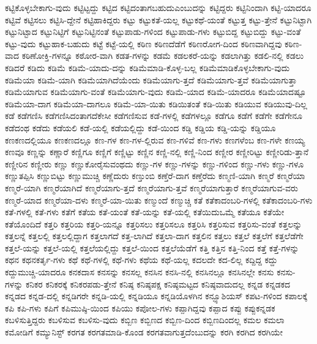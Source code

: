 {ಕಟ್ಟಿಕೊಳ್ಳಬೇಕಾಗು-ವುದು
ಕಟ್ಟಿಟ್ಟದ್ದು
ಕಟ್ಟಿದ
ಕಟ್ಟಿದಂತಾಗಬಹುದುಎಂಬುದನ್ನು
ಕಟ್ಟಿದ್ದರು
ಕಟ್ಟಿನಿಂದಾಗಿ
ಕಟ್ಟಿ-ಯಾದರೂ
ಕಟ್ಟಿವೆ
ಕಟ್ಟಿಸಲು
ಕಟ್ಟಿಸಿ-ದ್ದೇನೆ
ಕಟ್ಟಿಹಾಕಿದ್ದರು
ಕಟ್ಟು
ಕಟ್ಟುಕತೆ-ಯಲ್ಲ
ಕಟ್ಟುಕಥೆ-ಯಂತೆ
ಕಟ್ಟುತ್ತ
ಕಟ್ಟು-ತ್ತೇನೆ
ಕಟ್ಟುನಿಟ್ಟಾಗಿ
ಕಟ್ಟುನಿಟ್ಟಾದ
ಕಟ್ಟುನಿಟ್ಟಿಗೆ
ಕಟ್ಟುನಿಟ್ಟಿನಂತೆ
ಕಟ್ಟುಪಾಡು-ಗಳಿಂದ
ಕಟ್ಟುಪಾಡು-ಗಳು
ಕಟ್ಟುಬಿದ್ದ
ಕಟ್ಟುಬಿದ್ದು
ಕಟ್ಟು-ವಂತೆ
ಕಟ್ಟು-ವುದು
ಕಟ್ಟುಹಾಕ-ಬಹುದು
ಕಟ್ಟೆ
ಕಟ್ಟೆ-ಯಲ್ಲಿ
ಕಠಿಣ
ಕಠಿಣದೆಡೆಗೆ
ಕಠಿಣರೋಗ-ದಿಂದ
ಕಠಿಣವಾಗಿದ್ದವು
ಕಠಿಣ-ವಾದ
ಕಠಿಣೋಕ್ತಿ-ಗಳನ್ನೂ
ಕಠೋರ-ವಾಗಿ
ಕಡತ-ಗಳನ್ನು
ಕಡಮೆ
ಕಡಲಕರೆ-ಯನ್ನು
ಕಡಲಾಗಿತ್ತು
ಕಡಲಿ-ನಲ್ಲಿ
ಕಡಲು
ಕಡಿದರೆ
ಕಡಿದು
ಕಡಿಮೆ
ಕಡಿಮೆ-ಯಾದು-ದನ್ನು
ಕಡಿಮೆಮಾಡಿ-ಕೊಳ್ಳ-ಬಲ್ಲ
ಕಡಿಮೆಮಾಡಿಕೊಳ್ಳಬೇಕಾಗು-ವುದು
ಕಡಿಮೆಯಾ
ಕಡಿಮೆ-ಯಾಗಿ
ಕಡಿಮೆಯಾಗಿದೆಯೆಂದು
ಕಡಿಮೆಯಾಗು-ತ್ತದೆ
ಕಡಿಮೆಯಾಗು-ತ್ತವೆ
ಕಡಿಮೆಯಾಗುತ್ತಾ
ಕಡಿಮೆಯಾಗುವ
ಕಡಿಮೆಯಾಗು-ವಂತೆ
ಕಡಿಮೆಯಾಗು-ವುದು
ಕಡಿಮೆ-ಯಾದ
ಕಡಿಮೆ-ಯಾದರೂ
ಕಡಿಮೆಯಾದಷ್ಟೂ
ಕಡಿಮೆಯಾ-ದಾಗ
ಕಡಿಮೆಯಾ-ದಾಗಲೂ
ಕಡಿಮೆ-ಯಾ-ಯಿತು
ಕಡಿಯಿತಂತೆ
ಕಡಿ-ಯಿತು
ಕಡಿಯುವ
ಕಡಿಯುವು-ದಿಲ್ಲ
ಕಡೆ
ಕಡೆಗಣಿಸಿ
ಕಡೆಗಣಿಸಿದಂತಾಗದೆಕೇಸೀ
ಕಡೆಗಣಿಸುವ
ಕಡೆ-ಗಳಲ್ಲಿ
ಕಡೆಗಳಲ್ಲೂ
ಕಡೆಗೂ
ಕಡೆಗೆ
ಕಡೆಗೇ
ಕಡೆಗೇನೂ
ಕಡೆದಂಥ
ಕಡೆದು
ಕಡೆಯಲಿ
ಕಡೆ-ಯಲ್ಲಿ
ಕಡೆಯಲ್ಲಿದ್ದು
ಕಡೆ-ಯಿಂದ
ಕಡ್ಡಿ
ಕಡ್ಡಿಯ
ಕಡ್ಡಿ-ಯನ್ನು
ಕಡ್ಡಿಯೂ
ಕಣಕಣದಲ್ಲಿಯೂ
ಕಣಕಣದಲ್ಲೂ
ಕಣ-ಗಳ
ಕಣ-ಗಳ-ಲ್ಲಿರುವ
ಕಣ-ಗಳಿವೆ
ಕಣ-ಗಳು
ಕಣಗಳೆಂಬ
ಕಣ-ಗಳೇ
ಕಣಯ್ಯ
ಕಣವೂ
ಕಣ್ಣನ್ನು
ಕಣ್ಣಾರೆ
ಕಣ್ಣಿಗೂ
ಕಣ್ಣಿಗೆ
ಕಣ್ಣಿಟ್ಟು
ಕಣ್ಣಿನ
ಕಣ್ಣಿ-ನಲ್ಲಿ
ಕಣ್ಣಿ-ನಿಂದ
ಕಣ್ಣೀರ
ಕಣ್ಣೀರಿಟ್ಟು
ಕಣ್ಣೀರಿಡು-ತ್ತಾನೆ
ಕಣ್ಣೀರಿನ
ಕಣ್ಣೀರು
ಕಣ್ಣು
ಕಣ್ಣುಕೋರೈಸುವಂಥದು
ಕಣ್ಣು-ಗಳ
ಕಣ್ಣು-ಗಳನ್ನು
ಕಣ್ಣು-ಗಳಿಂದ
ಕಣ್ಣು-ಗಳು
ಕಣ್ಣು-ಗಳೂ
ಕಣ್ಣುತಪ್ಪಿಸಿ
ಕಣ್ಣುಬಿಟ್ಟು
ಕಣ್ಣುಮುಚ್ಚಿ
ಕಣ್ಣೆದುರು
ಕಣ್ತುಂಬಿ
ಕಣ್ತೆರೆ-ದಾಗ
ಕಣ್ತೆರೆದು
ಕಣ್ಮಣಿ-ಯಾಗಿ
ಕಣ್ಮರೆ
ಕಣ್ಮರೆಯಾ
ಕಣ್ಮರೆ-ಯಾಗಿ
ಕಣ್ಮರೆಯಾಗಿದೆ
ಕಣ್ಮರೆಯಾಗು-ತ್ತದೆ
ಕಣ್ಮರೆಯಾಗು-ತ್ತವೆ
ಕಣ್ಮರೆಯಾಗುತ್ತಾರೆ
ಕಣ್ಮರೆಯಾಗುವ-ವರು
ಕಣ್ಮರೆ-ಯಾದ
ಕಣ್ಮರೆಯಾ-ದಳು
ಕಣ್ಮರೆ-ಯಾ-ಯಿತು
ಕಣ್ಮುಂದೆ
ಕಣ್ಮುಚ್ಚಿ
ಕತೆ
ಕತೆಕಾದಂಬರಿ-ಗಳಲ್ಲಿ
ಕತೆಕಾದಂಬರಿ-ಗಳು
ಕತೆ-ಗಳಲ್ಲಿ
ಕತೆ-ಗಳು
ಕತೆಗೆ
ಕತೆಯ
ಕತೆ-ಯಂತೆ
ಕತೆ-ಯನ್ನು
ಕತೆ-ಯಲ್ಲಿ
ಕತೆಯಿದುಒಮ್ಮೆ
ಕತೆಯೂ
ಕತೆಯೇ
ಕತೆಯೊಂದಿದೆ
ಕತ್ತರಿ
ಕತ್ತರಿಯ
ಕತ್ತರಿ-ಯನ್ನೂ
ಕತ್ತರಿಸಲು
ಕತ್ತರಿಸಲೂ
ಕತ್ತರಿಸಿ
ಕತ್ತರಿಸುವ
ಕತ್ತರಿಸು-ವಂತೆ
ಕತ್ತಲನ್ನು
ಕತ್ತಲನ್ನೆ
ಕತ್ತಲಲ್ಲಿ
ಕತ್ತಲಲ್ಲಿದ್ದಾಗ
ಕತ್ತಲಾಗದೆ
ಕತ್ತ-ಲಾಗಿದೆ
ಕತ್ತಲಾ-ದಾಗ
ಕತ್ತಲಿನ
ಕತ್ತಲು
ಕತ್ತಲೆ
ಕತ್ತಲೆಗೆ
ಕತ್ತಲೆಡೆಗೇ
ಕತ್ತಲೆ-ಯನ್ನು
ಕತ್ತಲೆ-ಯಲ್ಲಿ
ಕತ್ತಲೆಯಲ್ಲಿದ್ದು
ಕತ್ತಲೆ-ಯಿಂದ
ಕತ್ತಲೆಯೆಡೆಗೆ
ಕತ್ತಿ
ಕತ್ತಿನ
ಕತ್ತಿ-ನಿಂದ
ಕತ್ತೆ
ಕತ್ತೆ-ಗಳನ್ನು
ಕಥನ
ಕಥನಕರ್ತೃ-ಗಳು
ಕಥೆ
ಕಥೆ-ಗಳಲ್ಲಿ
ಕಥೆ-ಗಳು
ಕಥೆಯ
ಕಥೆ-ಯಲ್ಲ
ಕದಲದೇ
ಕದ-ಲಿಲ್ಲ
ಕದ್ದಿದ್ದ
ಕದ್ದು
ಕದ್ದುಮುಚ್ಚಿ-ಯಾದರೂ
ಕನಕದಾಸ
ಕನಸನ್ನು
ಕನಸಲ್ಲ
ಕನಸಿನ
ಕನಸಿ-ನಲ್ಲಿ
ಕನಸಿನಲ್ಲೂ
ಕನಸಿನಲ್ಲೇ
ಕನಸು
ಕನಸು-ಗಳನ್ನು
ಕನಿಕರ
ಕನಿಕರಕ್ಕೆ
ಕನಿಕರಪಡು-ತ್ತೇನೆ
ಕನಿಷ್ಠ
ಕನಿಷ್ಠಪಕ್ಷ
ಕನಿಷ್ಠಮಟ್ಟದ
ಕನಿಷ್ಠವಾದುದಲ್ಲ
ಕನ್ನಡ
ಕನ್ನಡಕದ
ಕನ್ನಡದ
ಕನ್ನಡ-ದಲ್ಲಿ
ಕನ್ನಡಿಗರೇ
ಕನ್ನಡಿ-ಯಲ್ಲಿ
ಕನ್ನಡಿಯೂ
ಕನ್ನಡಿಯೊಳಗಿನ
ಕನ್ಫ್ಯೂಶಿಯಸ್
ಕಪಟ-ಗಳಿಂದ
ಕಪಾಲಕ್ಕೆ
ಕಪಿ
ಕಪಿ-ಗಳು
ಕಪಿಗೆ
ಕಪಿಮುಷ್ಠಿ-ಯಿಂದ
ಕಪಿಯು
ಕಪೋಲ-ಗಳು
ಕಪ್ಪಾಗಿದ್ದವು
ಕಪ್ಪಾದ
ಕಪ್ಪು
ಕಪ್ಪುಕನ್ನಡಕ
ಕಬಳಿಸುತ್ತಿದ್ದರು
ಕಬಳಿಸುವ
ಕಬಳಿಸು-ವುದು
ಕಬ್ಬಿಣ
ಕಬ್ಬಿಣದ
ಕಬ್ಬಿಣ-ದಿಂದ
ಕಬ್ಬಿಣದಿಂದಲ್ಲ
ಕಮಲ
ಕಮಲಾ
ಕಮೋಡಿಗೆ
ಕಮ್ಯುನಿಸ್ಟ್
ಕರಗತ
ಕರಗತಮಾಡಿ-ಕೊಂಡ
ಕರಗತವಾಗುತ್ತದೆಂಬುದನ್ನು
ಕರಗಿ
ಕರಗಿದ
ಕರಗಿಯೇ
}
